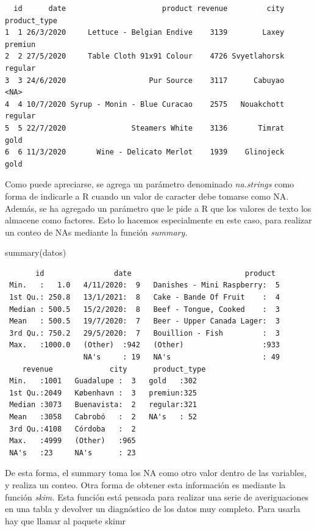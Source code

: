 \documentclass[
  letterpaper,
  DIV=11,
  numbers=noendperiod]{scrreprt}
\newenvironment{Shaded}{\begin{snugshade}}{\end{snugshade}}
\newcommand{\FunctionTok}[1]{\textcolor[rgb]{0.28,0.35,0.67}{#1}}
\newcommand{\NormalTok}[1]{\textcolor[rgb]{0.00,0.23,0.31}{#1}}
\begin{document}
\begin{verbatim}
  id      date                      product revenue         city product_type
1  1 26/3/2020     Lettuce - Belgian Endive    3139        Laxey      premiun
2  2 27/5/2020     Table Cloth 91x91 Colour    4726 Svyetlahorsk      regular
3  3 24/6/2020                   Pur Source    3117      Cabuyao         <NA>
4  4 10/7/2020 Syrup - Monin - Blue Curacao    2575   Nouakchott      regular
5  5 22/7/2020               Steamers White    3136       Timrat         gold
6  6 11/3/2020       Wine - Delicato Merlot    1939    Glinojeck         gold
\end{verbatim}

Como puede apreciarse, se agrega un parámetro denominado
\emph{na.strings} como forma de indicarle a R cuando un valor de
caracter debe tomarse como NA. Además, se ha agregado un parámetro que
le pide a R que los valores de texto los almacene como factores. Esto lo
hacemos especialmente en este caso, para realizar un conteo de NAs
mediante la función \emph{summary.}

\begin{Shaded}
\begin{Highlighting}[]
\FunctionTok{summary}\NormalTok{(datos)}
\end{Highlighting}
\end{Shaded}

\begin{verbatim}
       id                date                          product   
 Min.   :   1.0   4/11/2020:  9   Danishes - Mini Raspberry:  5  
 1st Qu.: 250.8   13/1/2021:  8   Cake - Bande Of Fruit    :  4  
 Median : 500.5   15/2/2020:  8   Beef - Tongue, Cooked    :  3  
 Mean   : 500.5   19/7/2020:  7   Beer - Upper Canada Lager:  3  
 3rd Qu.: 750.2   29/5/2020:  7   Bouillion - Fish         :  3  
 Max.   :1000.0   (Other)  :942   (Other)                  :933  
                  NA's     : 19   NA's                     : 49  
    revenue             city      product_type
 Min.   :1001   Guadalupe :  3   gold   :302  
 1st Qu.:2049   København :  3   premiun:325  
 Median :3073   Buenavista:  2   regular:321  
 Mean   :3058   Cabrobó   :  2   NA's   : 52  
 3rd Qu.:4108   Córdoba   :  2                
 Max.   :4999   (Other)   :965                
 NA's   :23     NA's      : 23                
\end{verbatim}

De esta forma, el summary toma los NA como otro valor dentro de las
variables, y realiza un conteo. Otra forma de obtener esta información
es mediante la función \emph{skim.} Esta función está pensada para
realizar una serie de averiguaciones en una tabla y devolver un
diagnóstico de los datos muy completo. Para usarla hay que llamar al
paquete skimr
\end{document}
